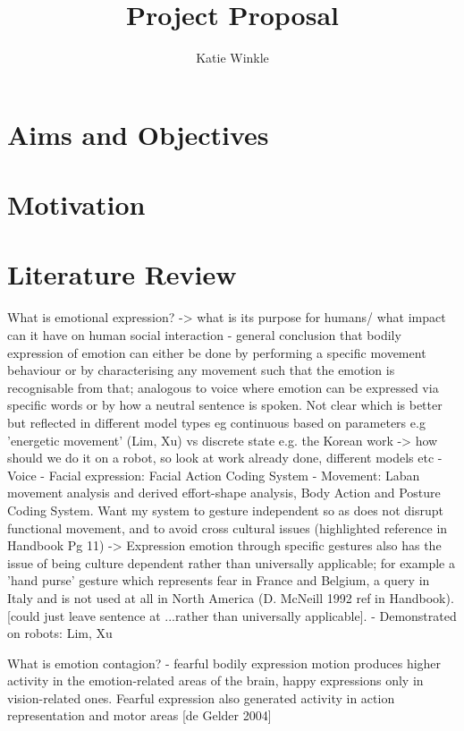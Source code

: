 \documentclass[]{article}
\title{Project Proposal}
\author{Katie Winkle}
\begin{document}
\maketitle

\begin{abstract}

\end{abstract}

\section{Aims and Objectives}
\section{Motivation}
\section{Literature Review}

What is emotional expression?
-> what is its purpose for humans/ what impact can it have on human social interaction
- general conclusion that bodily expression of emotion can either be done by performing a specific movement behaviour or by characterising any movement such that the emotion is recognisable from that; analogous to voice where emotion can be expressed via specific words or by how a neutral sentence is spoken. Not clear which is better but reflected in different model types eg continuous based on parameters e.g 'energetic movement' (Lim, Xu) vs discrete state e.g. the Korean work 
-> how should we do it on a robot, so look at work already done, different models etc
- Voice
- Facial expression: Facial Action Coding System
- Movement: Laban movement analysis and derived effort-shape analysis, Body Action and Posture Coding System. Want my system to gesture independent so as does not disrupt functional movement, and to avoid cross cultural issues (highlighted reference in Handbook Pg 11)
-> Expression emotion through specific gestures also has the issue of being culture dependent rather than universally applicable; for example a 'hand purse' gesture which represents fear in France and Belgium, a query in Italy and is not used at all in North America (D. McNeill 1992 ref in Handbook). [could just leave sentence at ...rather than universally applicable].  
- Demonstrated on robots: Lim, Xu

What is emotion contagion?
- fearful bodily expression motion produces higher activity in the emotion-related areas of the brain, happy expressions only in vision-related ones. Fearful expression also generated activity in action representation and motor areas [de Gelder 2004]
\end{document}
